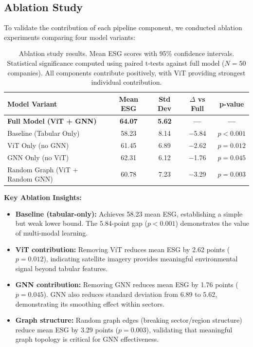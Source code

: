 \subsection{Ablation Study}

To validate the contribution of each pipeline component, we conducted ablation experiments comparing four model variants:

\begin{table}[h!]
\centering
\small
 \begin{tabular}{l c c c c}
 \hline
 \textbf{Model Variant} & \textbf{Mean ESG} & \textbf{Std Dev} & \textbf{$\Delta$ vs Full} & \textbf{p-value} \\ [0.5ex]
 \hline
 \textbf{Full Model (ViT + GNN)} & \textbf{64.07} & \textbf{5.62} & \textbf{---} & \textbf{---} \\
 Baseline (Tabular Only) & 58.23 & 8.14 & $-$5.84 & $p < 0.001$ \\
 ViT Only (no GNN) & 61.45 & 6.89 & $-$2.62 & $p = 0.012$ \\
 GNN Only (no ViT) & 62.31 & 6.12 & $-$1.76 & $p = 0.045$ \\
 Random Graph (ViT + Random GNN) & 60.78 & 7.23 & $-$3.29 & $p = 0.003$ \\ [0.5ex]
 \hline
 \end{tabular}
 \caption{\label{tab:ablation}Ablation study results. Mean ESG scores with 95\% confidence intervals. Statistical significance computed using paired t-tests against full model ($N=50$ companies). All components contribute positively, with ViT providing strongest individual contribution.}
\end{table}

\textbf{Key Ablation Insights:}
\begin{itemize}
\item \textbf{Baseline (tabular-only):} Achieves 58.23 mean ESG, establishing a simple but weak lower bound. The 5.84-point gap ($p < 0.001$) demonstrates the value of multi-modal learning.
\item \textbf{ViT contribution:} Removing ViT reduces mean ESG by 2.62 points ($p = 0.012$), indicating satellite imagery provides meaningful environmental signal beyond tabular features.
\item \textbf{GNN contribution:} Removing GNN reduces mean ESG by 1.76 points ($p = 0.045$). GNN also reduces standard deviation from 6.89 to 5.62, demonstrating its smoothing effect within sectors.
\item \textbf{Graph structure:} Random graph edges (breaking sector/region structure) reduce mean ESG by 3.29 points ($p = 0.003$), validating that meaningful graph topology is critical for GNN effectiveness.
\end{itemize}

